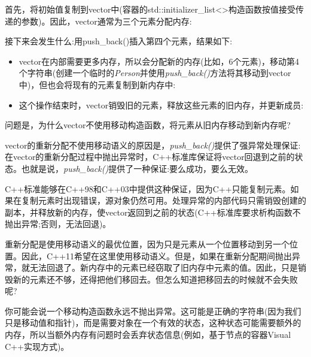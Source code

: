 首先，将初始值复制到vector中(容器的std::initializer\_list<>构造函数按值接受传递的参数)。因此，vector通常为三个元素分配内存:\par


接下来会发生什么:用push\_back()插入第四个元素，结果如下:\par

\begin{itemize}
  \item vector在内部需要更多内存，所以会分配新的内存(比如，6个元素)，移动第4个字符串(创建一个临时的\textit{Person}并使用\textit{push\_\allowbreak{}back(\allowbreak{})\allowbreak{}}方法将其移动到vector中)，但也会将现有的元素复制到新内存中:\par
{}
  \item 这个操作结束时，vector销毁旧的元素，释放这些元素的旧内存，并更新成员:\par
{}
\end{itemize}

问题是，为什么vector不使用移动构造函数，将元素从旧内存移动到新内存呢?\par


vector的重新分配不使用移动语义的原因是，\textit{push\_\allowbreak{}back(\allowbreak{})\allowbreak{}}提供了强异常处理保证:在vector的重新分配过程中抛出异常时，C++标准库保证将vector回退到之前的状态。也就是说，\textit{push\_\allowbreak{}back(\allowbreak{})\allowbreak{}}提供了一种保证:要么成功，要么无效。\par

C++标准能够在C++98和C++03中提供这种保证，因为C++只能复制元素。如果在复制元素时出现错误，源对象仍然可用。处理异常的内部代码只需销毁创建的副本，并释放新的内存，使vector返回到之前的状态(C++标准库要求析构函数不抛出异常;否则，无法回退)。\par

重新分配是使用移动语义的最优位置，因为只是元素从一个位置移动到另一个位置。因此，C++11希望在这里使用移动语义。但是，如果在重新分配期间抛出异常，就无法回退了。新内存中的元素已经窃取了旧内存中元素的值。因此，只是销毁新的元素还不够，还得把他们移回去。但怎么知道把移回去的时候就不会失败呢?\par

你可能会说一个移动构造函数永远不抛出异常。这可能是正确的字符串(因为我们只是移动值和指针)，而是需要对象在一个有效的状态，这种状态可能需要额外的内存，所以当额外内存有问题时会丢弃状态信息(例如，基于节点的容器Visual C++实现方式)。\par

